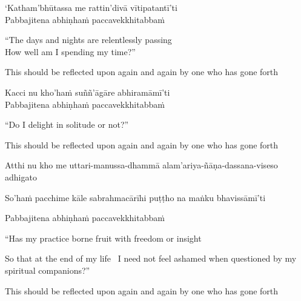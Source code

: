 `Katham'bhūtassa me rattin'divā vītipatantī'ti\\
Pabbajitena abhiṇhaṁ paccavekkhitabbaṁ

\begin{english-verses}
  ``The days and nights are relentlessly passing\\
  How well am I spending my time?''
  \begin{english-hangtogether-verses}
    This should be reflected upon again and again by one who has gone forth
  \end{english-hangtogether-verses}
\end{english-verses}

Kacci nu kho'haṁ suññ'āgāre abhiramāmī'ti\\
Pabbajitena abhiṇhaṁ paccavekkhitabbaṁ

\begin{english-verses}
  ``Do I delight in solitude or not?''
  \begin{english-hangtogether-verses}
    This should be reflected upon again and again by one who has gone forth
  \end{english-hangtogether-verses}
\end{english-verses}

\begin{pali-hang}
  Atthi nu kho me uttari-manussa-dhammā alam'ariya-ñāṇa-dassana-viseso adhigato
\end{pali-hang}
\begin{pali-hangtogether}
  So'haṁ pacchime kāle sabrahmacārīhi puṭṭho na maṅku bhavissāmī'ti
\end{pali-hangtogether}
\begin{pali-hangtogether}
  Pabbajitena abhiṇhaṁ paccavekkhitabbaṁ
\end{pali-hangtogether}

\begin{english-verses}
  ``Has my practice borne fruit with freedom or insight\\
  \begin{english-hangtogether-verses}
    So that at the end of my life \breathmark\ I need not feel ashamed when questioned by my spiritual companions?''
  \end{english-hangtogether-verses}
  \begin{english-hangtogether-verses}
    This should be reflected upon again and again by one who has gone forth
  \end{english-hangtogether-verses}
\end{english-verses}


